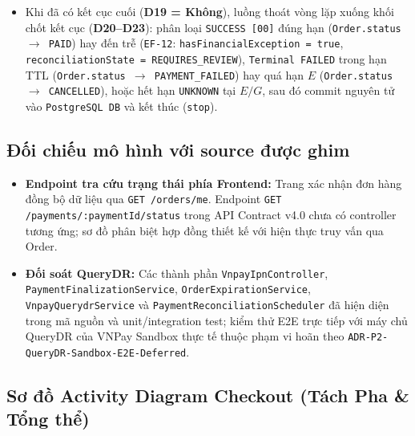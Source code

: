 \begin{enumerate}
\begin{itemize}
\begin{itemize}
\begin{itemize}
\begin{itemize}
        \end{itemize}
      \end{itemize}
      \item Tại điều kiện lặp \textbf{D19 (\texttt{repeat while})}: nếu giao dịch vẫn đang ở trạng thái tạm thời (\(\text{now} < E\) hoặc \(E \le \text{now} < G\)) và chưa có kết cục cuối (\texttt{Có}), hệ thống chờ chu kỳ Scheduler kế tiếp hoặc sự kiện IPN để đánh giá lại khi thời gian tiến tới \(E\) / \(G\).
    \end{itemize}
    \item Khi đã có kết cục cuối (\textbf{D19 = Không}), luồng thoát vòng lặp xuống khối chốt kết cục (\textbf{D20--D23}): phân loại \texttt{SUCCESS [00]} đúng hạn (\texttt{Order.status \(\rightarrow\) PAID}) hay đến trễ (\texttt{EF-12}: \texttt{hasFinancialException = true}, \texttt{reconciliationState = REQUIRES\_REVIEW}), \texttt{Terminal FAILED} trong hạn TTL (\texttt{Order.status \(\rightarrow\) PAYMENT\_FAILED}) hay quá hạn \(E\) (\texttt{Order.status \(\rightarrow\) CANCELLED}), hoặc hết hạn \texttt{UNKNOWN} tại \(E / G\), sau đó commit nguyên tử vào \texttt{PostgreSQL DB} và kết thúc (\texttt{stop}).
  \end{itemize}
\end{enumerate}

\subsection{Đối chiếu mô hình với source được ghim}

\begin{itemize}
  \item \textbf{Endpoint tra cứu trạng thái phía Frontend:} Trang xác nhận đơn hàng đồng bộ dữ liệu qua \texttt{GET /orders/me}. Endpoint \texttt{GET /payments/:paymentId/status} trong API Contract v4.0 chưa có controller tương ứng; sơ đồ phân biệt hợp đồng thiết kế với hiện thực truy vấn qua Order.
  \item \textbf{Đối soát QueryDR:} Các thành phần \texttt{VnpayIpnController}, \texttt{PaymentFinalizationService}, \texttt{OrderExpirationService}, \texttt{VnpayQuerydrService} và \texttt{PaymentReconciliationScheduler} đã hiện diện trong mã nguồn và unit/integration test; kiểm thử E2E trực tiếp với máy chủ QueryDR của VNPay Sandbox thực tế thuộc phạm vi hoãn theo \texttt{ADR-P2-QueryDR-Sandbox-E2E-Deferred}.
\end{itemize}

\subsection{Sơ đồ Activity Diagram Checkout (Tách Pha \& Tổng thể)}

